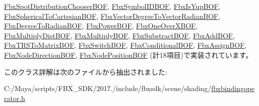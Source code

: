 \hyperlink{class_fbx_spot_distribution_chooser_b_o_f_a8442158a644f0c6c24cbcf30d86413c7}{Fbx\+Spot\+Distribution\+Chooser\+B\+OF}, \hyperlink{class_fbx_symbol_i_d_b_o_f_a2d4eee3d2a4fbf9790b2491ed33846b3}{Fbx\+Symbol\+I\+D\+B\+OF}, \hyperlink{class_fbx_is_yup_b_o_f_a27c960322c0b7c6a4aec67484fcfcf52}{Fbx\+Is\+Yup\+B\+OF}, \hyperlink{class_fbx_spherical_to_cartesian_b_o_f_a05d7c7e0e46df48e22f01f0b09a86bae}{Fbx\+Spherical\+To\+Cartesian\+B\+OF}, \hyperlink{class_fbx_vector_degree_to_vector_radian_b_o_f_a09862a90a073963e88f63afdc60c67c8}{Fbx\+Vector\+Degree\+To\+Vector\+Radian\+B\+OF}, \hyperlink{class_fbx_degree_to_radian_b_o_f_a65c7f3fdae835f27e123b2efc8aaf9da}{Fbx\+Degree\+To\+Radian\+B\+OF}, \hyperlink{class_fbx_power_b_o_f_a6117db8807508595bbe95de7e547cad3}{Fbx\+Power\+B\+OF}, \hyperlink{class_fbx_one_over_x_b_o_f_afa8f32a5706dd4cfee3f69547fdeebe4}{Fbx\+One\+Over\+X\+B\+OF}, \hyperlink{class_fbx_multiply_dist_b_o_f_af5eef2d2b8168d2be835a1643fa35ca1}{Fbx\+Multiply\+Dist\+B\+OF}, \hyperlink{class_fbx_multiply_b_o_f_a54c8a0996a65b3d9bafcbcabf1594745}{Fbx\+Multiply\+B\+OF}, \hyperlink{class_fbx_substract_b_o_f_a86004768a640d77ca9d7d937c4a91d2c}{Fbx\+Substract\+B\+OF}, \hyperlink{class_fbx_add_b_o_f_aee96f76da5722af28d12b65eefcc61bb}{Fbx\+Add\+B\+OF}, \hyperlink{class_fbx_t_r_s_to_matrix_b_o_f_a0152c2805f41834ea2554d4d865e308c}{Fbx\+T\+R\+S\+To\+Matrix\+B\+OF}, \hyperlink{class_fbx_switch_b_o_f_af48ca495a335e415853ec0c5269867a6}{Fbx\+Switch\+B\+OF}, \hyperlink{class_fbx_conditional_b_o_f_a2d20cc9f6b6e1c5a469c49a55c8ed512}{Fbx\+Conditional\+B\+OF}, \hyperlink{class_fbx_assign_b_o_f_ae2342d6ad5f7bc8182cc14c562290247}{Fbx\+Assign\+B\+OF}, \hyperlink{class_fbx_node_direction_b_o_f_ae550509066a010d97d92777df2cba41e}{Fbx\+Node\+Direction\+B\+OF}, \hyperlink{class_fbx_node_position_b_o_f_a1f42ed86523fe35e64c63ee1c85dc22a}{Fbx\+Node\+Position\+B\+OF} (計18項目)で実装されています。



このクラス詳解は次のファイルから抽出されました\+:\begin{DoxyCompactItemize}
\item 
C\+:/\+Maya/scripts/\+F\+B\+X\+\_\+\+S\+D\+K/2017./include/fbxsdk/scene/shading/\hyperlink{fbxbindingoperator_8h}{fbxbindingoperator.\+h}\end{DoxyCompactItemize}
